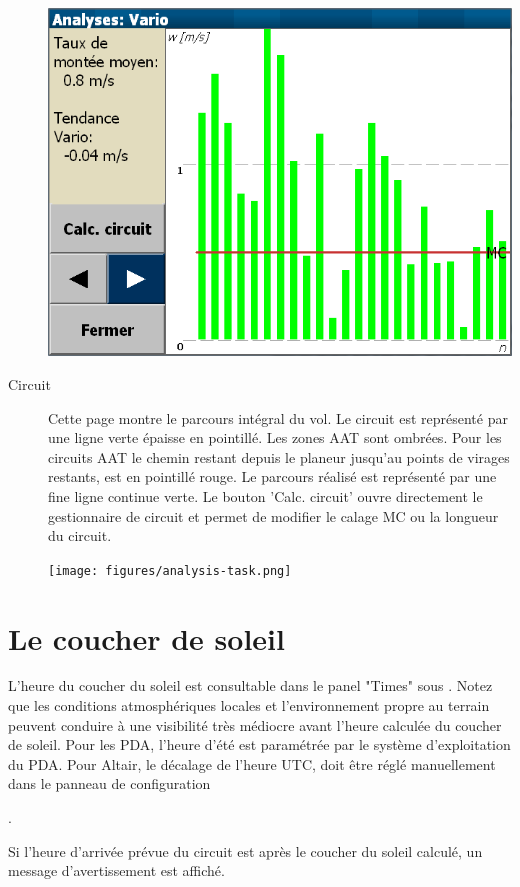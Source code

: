 \begin{description}
\begin{center}
\includegraphics[angle=0,width=0.8\linewidth,keepaspectratio='true']{figures/analysis-climb.png}
\end{center}

\item[Circuit]
Cette page montre le parcours intégral du vol. Le circuit est représenté par une ligne verte épaisse en pointillé. Les zones AAT sont ombrées. Pour les circuits AAT le chemin restant depuis le planeur jusqu'au points de virages restants, est en pointillé rouge. Le parcours réalisé est représenté par une fine ligne continue verte.
  Le bouton 'Calc. circuit' ouvre directement le gestionnaire de circuit et permet de modifier le calage MC ou la longueur du circuit.

\begin{center}
\texttt{[image: figures/analysis-task.png]}
\end{center}

\end{description}

\section{Le coucher de soleil}

L'heure du coucher du soleil est consultable dans le panel "Times"  sous \blink{}. Notez que les conditions atmosphériques locales et l'environnement propre au terrain peuvent conduire à une visibilité très médiocre avant l'heure calculée du coucher de soleil.
Pour les PDA, l'heure d'été est paramétrée par le système d'exploitation du PDA. Pour Altair, le décalage de l'heure UTC, doit être réglé manuellement dans le panneau de configuration

 \blink{}\blink{}\blink{}.

Si l'heure d'arrivée prévue du circuit est après le coucher du soleil calculé, un message d'avertissement est affiché.

